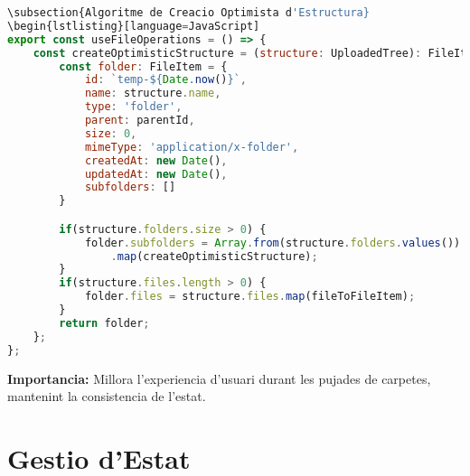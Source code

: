 \begin{lstlisting}[language=JavaScript]
\subsection{Algoritme de Creacio Optimista d'Estructura}
\begin{lstlisting}[language=JavaScript]
export const useFileOperations = () => {
    const createOptimisticStructure = (structure: UploadedTree): FileItem => {
        const folder: FileItem = {
            id: `temp-${Date.now()}`,
            name: structure.name,
            type: 'folder',
            parent: parentId,
            size: 0,
            mimeType: 'application/x-folder',
            createdAt: new Date(),
            updatedAt: new Date(),
            subfolders: []
        }

        if(structure.folders.size > 0) {
            folder.subfolders = Array.from(structure.folders.values())
                .map(createOptimisticStructure);
        }
        if(structure.files.length > 0) {
            folder.files = structure.files.map(fileToFileItem);
        }
        return folder;
    };
};
\end{lstlisting}
\textbf{Importancia:} Millora l'experiencia d'usuari durant les pujades de carpetes, mantenint la consistencia de l'estat.

\section{Gestio d'Estat}

